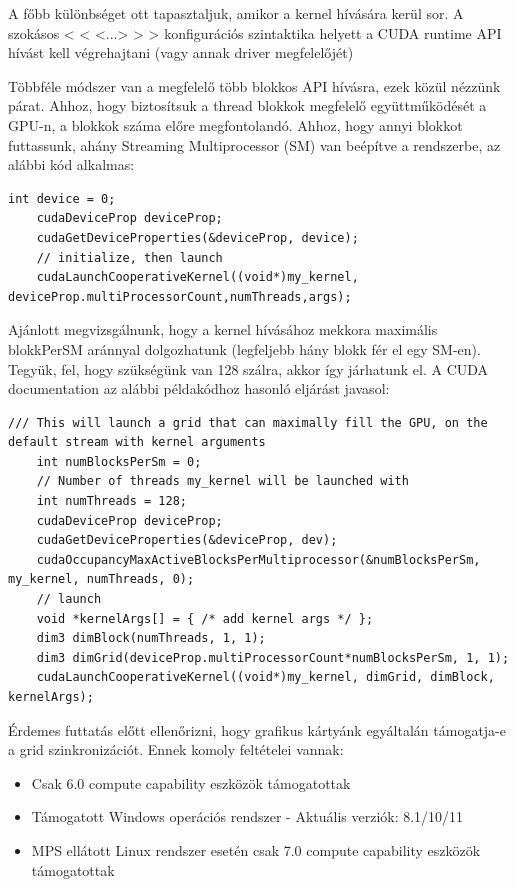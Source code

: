 A főbb különbséget ott tapasztaljuk, amikor a kernel hívására kerül sor. A szokásos < < <...> > > konfigurációs szintaktika helyett a CUDA runtime API hívást kell végrehajtani (vagy annak driver megfelelőjét) \cite{CooperativeLaunchkernel}

Többféle módszer van a megfelelő több blokkos API hívásra, ezek közül nézzünk párat.
Ahhoz, hogy biztosítsuk a thread blokkok megfelelő együttműködését a GPU-n, a blokkok száma előre megfontolandó. Ahhoz, hogy annyi blokkot futtassunk, ahány Streaming Multiprocessor (SM) van beépítve a rendszerbe, az alábbi kód alkalmas:
\begin{lstlisting}[style=CStyle]
	int device = 0;
	cudaDeviceProp deviceProp;
	cudaGetDeviceProperties(&deviceProp, device);
	// initialize, then launch
	cudaLaunchCooperativeKernel((void*)my_kernel, deviceProp.multiProcessorCount,numThreads,args);
\end{lstlisting}

Ajánlott megvizsgálnunk, hogy a kernel hívásához mekkora maximális blokkPerSM aránnyal dolgozhatunk (legfeljebb hány blokk fér el egy SM-en). Tegyük, fel, hogy szükségünk van 128 szálra, akkor így járhatunk el. A CUDA documentation az alábbi példakódhoz hasonló eljárást javasol:

\begin{lstlisting}[style=CStyle]
	/// This will launch a grid that can maximally fill the GPU, on the default stream with kernel arguments
	int numBlocksPerSm = 0;
	// Number of threads my_kernel will be launched with
	int numThreads = 128;
	cudaDeviceProp deviceProp;
	cudaGetDeviceProperties(&deviceProp, dev);
	cudaOccupancyMaxActiveBlocksPerMultiprocessor(&numBlocksPerSm, my_kernel, numThreads, 0);
	// launch
	void *kernelArgs[] = { /* add kernel args */ };
	dim3 dimBlock(numThreads, 1, 1);
	dim3 dimGrid(deviceProp.multiProcessorCount*numBlocksPerSm, 1, 1);
	cudaLaunchCooperativeKernel((void*)my_kernel, dimGrid, dimBlock, kernelArgs);
\end{lstlisting}

Érdemes futtatás előtt ellenőrizni, hogy grafikus kártyánk egyáltalán támogatja-e a grid szinkronizációt. Ennek komoly feltételei vannak:
\begin{itemize}
	\item Csak 6.0 compute capability eszközök támogatottak
	\item Támogatott Windows operációs rendszer - Aktuális verziók: 8.1/10/11 \cite{supportedWinOS} 
	\item MPS ellátott Linux rendszer esetén csak 7.0 compute capability eszközök támogatottak
\end{itemize}


